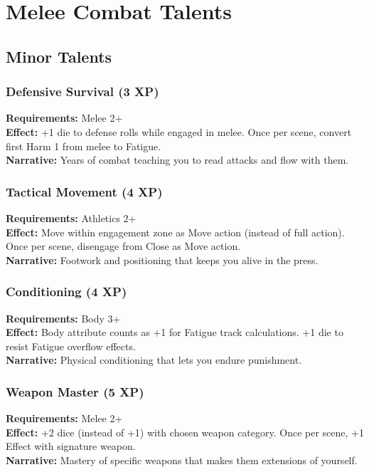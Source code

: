 \section{Melee Combat Talents}

\subsection{Minor Talents}

\subsubsection{Defensive Survival (3 XP)}
\textbf{Requirements:} Melee 2+ \\
\textbf{Effect:} +1 die to defense rolls while engaged in melee. Once per scene, convert first Harm 1 from melee to Fatigue. \\
\textbf{Narrative:} Years of combat teaching you to read attacks and flow with them.

\subsubsection{Tactical Movement (4 XP)}
\textbf{Requirements:} Athletics 2+ \\
\textbf{Effect:} Move within engagement zone as Move action (instead of full action). Once per scene, disengage from Close as Move action. \\
\textbf{Narrative:} Footwork and positioning that keeps you alive in the press.

\subsubsection{Conditioning (4 XP)}
\textbf{Requirements:} Body 3+ \\
\textbf{Effect:} Body attribute counts as +1 for Fatigue track calculations. +1 die to resist Fatigue overflow effects. \\
\textbf{Narrative:} Physical conditioning that lets you endure punishment.

\subsubsection{Weapon Master (5 XP)}
\textbf{Requirements:} Melee 2+ \\
\textbf{Effect:} +2 dice (instead of +1) with chosen weapon category. Once per scene, +1 Effect with signature weapon. \\
\textbf{Narrative:} Mastery of specific weapons that makes them extensions of yourself.

